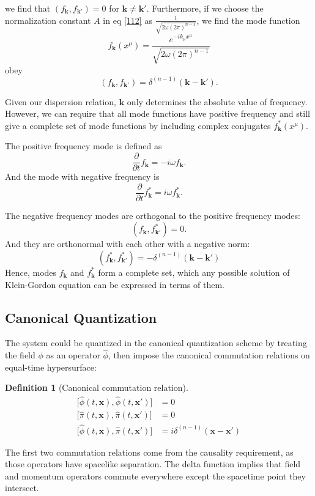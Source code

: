\documentclass[12pt]{article}
\numberwithin{equation}{section}
\theoremstyle{1style}
\newtheorem{definition}[equation]{Definition}
\newcommand{\p}{\partial}
\begin{document}
we find that \(\left(f_{\mathbf{k}},f_{\mathbf{k}'}\right)=0\) for \(\mathbf{k}\neq\mathbf{k'}\).
Furthermore, if we choose the normalization constant \(A\) in eq \ref{112} as
\(\frac{1}{\sqrt{2\omega(2\pi)^{n-1}}}\), we find the mode function
\begin{equation}
  f_{\mathbf{k}}(x^{\mu})=\frac{e^{-ik_{\mu}x^{\mu}}}{\sqrt{2\omega(2\pi)^{n-1}}}
\end{equation}
obey
\begin{equation}
  \left(f_{\mathbf{k}},f_{\mathbf{k}'}\right)=\delta^{(n-1)}(\mathbf{k}-\mathbf{k}').
\end{equation}

Given our dispersion relation, \(\mathbf{k}\) only determines the absolute value of frequency.
However, we can require that all mode functions have positive frequency and still give a complete set of mode functions by
including complex conjugates \(f^*_{\mathbf{k}}(x^{\mu})\).

The positive frequency mode is defined as \[\frac{\p}{\p t}f_{\mathbf{k}}=-i\omega f_{\mathbf{k}}.\]
And the mode with negative frequency is \[\frac{\p}{\p t}f^*_{\mathbf{k}}=i\omega f^*_{\mathbf{k}}.\]

The negative frequency modes are orthogonal to the positive frequency modes:
\begin{equation}
  \left(f_{\mathbf{k}},f^*_{\mathbf{k}'}\right)=0.
\end{equation}
And they are orthonormal with each other with a negative norm:
\begin{equation}
  \left(f^*_{\mathbf{k}},f^*_{\mathbf{k}'}\right)=-\delta^{(n-1)}(\mathbf{k}-\mathbf{k'})
\end{equation}
Hence, modes \(f_{\mathbf{k}}\) and \(f^*_{\mathbf{k}}\) form a complete set, which any possible solution
of Klein-Gordon equation can be expressed in terms of them.


\subsection{Canonical Quantization}

The system could be quantized in the canonical quantization scheme by treating the field \(\phi\) as an operator \(\hat{\phi}\),
then impose the canonical commutation relations on equal-time hypersurface:
\begin{definition}[Canonical commutation relation]\label{121}
  \begin{align*}
    \bigl[\hat{\phi}(t,\mathbf{x}),\hat{\phi}(t,\mathbf{x'})\bigr] & =0                                       \\
    \bigl[\hat{\pi}(t,\mathbf{x}),\hat{\pi}(t,\mathbf{x'})\bigr]   & =0                                       \\
    \bigl[\hat{\phi}(t,\mathbf{x}),\hat{\pi}(t,\mathbf{x'})\bigr]  & =i\delta^{(n-1)}(\mathbf{x}-\mathbf{x'})
  \end{align*}
\end{definition}
The first two commutation relations come from the causality requirement, as those operators have spacelike separation.
The delta function implies that field and momentum operators commute everywhere except the spacetime point they intersect.
\end{document}
